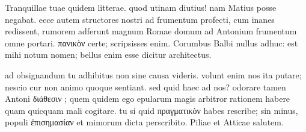 


 Tranquillae tuae quidem litterae. quod utinam diutius! nam Matius posse negabat. ecce autem structores nostri ad frumentum profecti, cum inanes redissent, rumorem adferunt magnum Romae domum ad Antonium frumentum omne portari. πανικὸν certe; scripsisses enim. Corumbus Balbi nullus adhuc: est mihi notum nomen; bellus enim esse dicitur architectus.

 ad obsignandum tu adhibitus non sine causa videris. volunt enim nos ita putare; nescio cur non animo quoque sentiant. sed quid haec ad nos? odorare tamen Antoni διάθεσιν ; quem quidem ego epularum magis arbitror rationem habere quam quicquam mali cogitare. tu si quid πραγματικὸν habes rescribe; sin minus, populi ἐπισημασίαν et mimorum dicta perscribito. Piliae et Atticae salutem.
